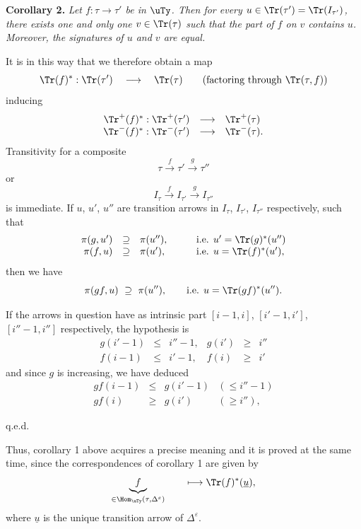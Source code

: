 \textbf{Corollary 2.} \textit{Let $f : \tau \longrightarrow \tau'$ be in $\uTy$. Then for every $u \in \Tr(\tau') = \Tr(I_{\tau'})$, there exists one and only one $v \in \Tr(\tau)$ such that the part of $f$ on $v$ contains $u$. Moreover, the signatures of $u$ and $v$ are equal.}

It is in this way that we therefore obtain a map
\[
\Tr(f)^* : \Tr(\tau') \quad \longrightarrow \quad \Tr(\tau) \qquad (\text{factoring through } \Tr(\tau, f))
\]
inducing
\[
\begin{array}{rcl}
\Tr^+(f)^* : \Tr^+(\tau') & \longrightarrow & \Tr^+(\tau) \\
\Tr^-(f)^* : \Tr^-(\tau') & \longrightarrow & \Tr^-(\tau).
\end{array}
\]
Transitivity for a composite
\[
\tau \xrightarrow{f} \tau' \xrightarrow{g} \tau''
\]
or
\[
I_\tau \xrightarrow{f} I_{\tau'} \xrightarrow{g} I_{\tau''}
\]
is immediate. If $u$, $u'$, $u''$ are transition arrows in $I_\tau$, $I_{\tau'}$, $I_{\tau''}$ respectively, such that
\[
\begin{array}{rcll}
\pi(g, u') & \supseteq & \pi(u''), & \qquad \text{i.e. } u' = \Tr(g)^*(u'') \\
\pi(f, u) & \supseteq & \pi(u'), & \qquad \text{i.e. } u = \Tr(f)^*(u'),
\end{array}
\]
then we have
\[
\pi(gf, u) \ \supseteq\ \pi(u''), \qquad \text{i.e. } u = \Tr(gf)^*(u'').
\]

If the arrows in question have as intrinsic part $[i-1, i]$, $[i'-1, i']$, $[i''-1, i'']$ respectively, the hypothesis is
\[
\begin{array}{rclrcl}
g(i'-1) & \leq & i''-1, & g(i') & \geq & i'' \\
f(i-1) & \leq & i'-1, & f(i) & \geq & i'
\end{array}
\]
and since $g$ is increasing, we have deduced
\[
\begin{array}{rcll}
gf(i-1) & \leq & g(i'-1) & (\leq i''-1) \\
gf(i) & \geq & g(i') & (\geq i''),
\end{array}
\]
\begin{flushright}
q.e.d.
\end{flushright}


Thus, corollary 1 above acquires a precise meaning and it is proved at the same time, since the correspondences of corollary 1 are given by
\[
\underbrace{f}_{\in \Hom_{\uTy}(\tau, \Delta^{\varepsilon})} \qquad \longmapsto \Tr(f)^*(\underline{u}),
\]
where $\underline{u}$ is the unique transition arrow of $\Delta^{\varepsilon}$.

